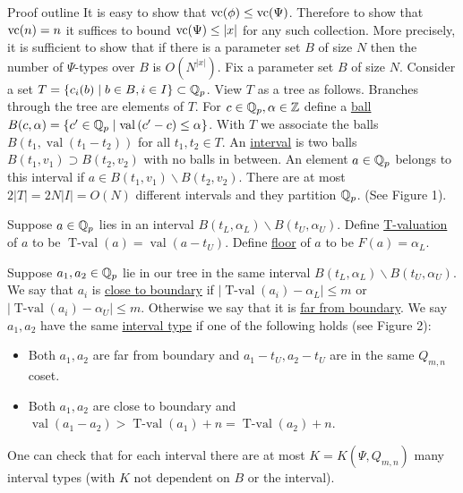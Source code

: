 \documentclass[final]{beamer}
\newcommand{\curly}[1]{\left\{ #1 \right\}}
\newcommand{\paren}[1]{\left( #1 \right)}
\newcommand{\defn}{\underline}
\DeclareMathOperator{\vval}{val}
\DeclareMathOperator{\tval}{T-val}
\newlength{\onecolwid}
\begin{document}
\begin{frame}[t]
\begin{columns}[t]
\begin{column}{\onecolwid}
\begin{block}{Proof outline}
        It is easy to show that $\operatorname{vc}(\phi) \leq \operatorname{vc}(\Psi)$.
        Therefore to show that $\operatorname{vc}(n) = n$ it suffices to bound $\operatorname{vc}(\Psi) \leq |x|$ for any such collection.
        More precisely, it is sufficient to show that if there is a parameter set $B$ of size $N$
        then the number of $\Psi$-types over $B$ is $O(N^{|x|})$.
                Fix a parameter set $B$ of size $N$.
                Consider a set $T = \curly{c_i(b) \mid b \in B, i \in I} \subset \Q_p$.
                View $T$ as a tree as follows.
                Branches through the tree are elements of $T$.
        For $c \in \mathbb{Q}_p, \alpha \in \mathbb{Z}$  define a \defn{ball} 
                        $B(c, \alpha) = \curly{c' \in \Q_p \mid \vval \paren{c' - c} \leq \alpha}$.
                With $T$ we associate the balls $B(t_1, \vval(t_1 - t_2))$ for all $t_1, t_2 \in T$.
                An \defn{interval} is two balls $B(t_1, v_1) \supset B(t_2, v_2)$ with no balls in between.
                An element $a \in \mathbb{Q}_p$ belongs to this interval if $a \in B(t_1, v_1) \backslash B(t_2, v_2)$.
                There are at most $2|T| = 2 N |I| = O(N)$ different intervals and they partition $\mathbb{Q}_p$.
                (See {\color{blue}Figure 1}).

                Suppose $a \in \mathbb{Q}_p$ lies in an interval $B(t_L, \alpha_L) \backslash B(t_U, \alpha_U)$.
                Define \defn{T-valuation} of $a$ to be $\tval(a) = \vval(a - t_U)$.    
                Define \defn{floor} of $a$ to be $F(a) = \alpha_L$.

            Suppose $a_1, a_2 \in \mathbb{Q}_p$ lie in our tree in the same interval $B(t_L, \alpha_L) \backslash B(t_U, \alpha_U)$.
            We say that $a_i$ is \defn{close to boundary} if $|\tval(a_i) - \alpha_L| \leq m$ or $|\tval(a_i) - \alpha_U| \leq m$.
            Otherwise we say that it is \defn{far from boundary}.
            We say $a_1, a_2$ have the same \defn{interval type} if one of the following holds (see {\color{blue}Figure 2}):
            \begin{itemize}
                \item Both $a_1, a_2$ are far from boundary and $a_1 - t_U, a_2 - t_U$ are in the same $Q_{m,n}$ coset.
                \item Both $a_1, a_2$ are close to boundary and $\vval(a_1 - a_2) > \tval(a_1) + n = \tval(a_2) + n$.
            \end{itemize}      

        One can check that for each interval there are at most $K = K(\Psi, Q_{m,n})$ many interval types (with $K$ not dependent on $B$ or the interval).


\end{block}
\end{column}
\end{columns}
\end{frame}
\end{document}
